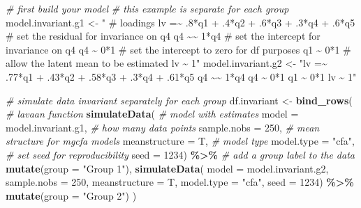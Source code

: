 \documentclass[
  man]{apa7}
\newenvironment{Shaded}{\begin{snugshade}}{\end{snugshade}}
\newcommand{\AttributeTok}[1]{\textcolor[rgb]{0.13,0.29,0.53}{#1}}
\newcommand{\CommentTok}[1]{\textcolor[rgb]{0.56,0.35,0.01}{\textit{#1}}}
\newcommand{\DecValTok}[1]{\textcolor[rgb]{0.00,0.00,0.81}{#1}}
\newcommand{\FunctionTok}[1]{\textcolor[rgb]{0.13,0.29,0.53}{\textbf{#1}}}
\newcommand{\NormalTok}[1]{#1}
\newcommand{\OtherTok}[1]{\textcolor[rgb]{0.56,0.35,0.01}{#1}}
\newcommand{\SpecialCharTok}[1]{\textcolor[rgb]{0.81,0.36,0.00}{\textbf{#1}}}
\newcommand{\StringTok}[1]{\textcolor[rgb]{0.31,0.60,0.02}{#1}}
\begin{document}
\begin{Shaded}
\begin{Highlighting}[]
\CommentTok{\# first build your model}
\CommentTok{\# this example is separate for each group}
\NormalTok{model.invariant.g1 }\OtherTok{\textless{}{-}} \StringTok{"}
\StringTok{\# loadings}
\StringTok{lv =\textasciitilde{} .8*q1 + .4*q2 + .6*q3 + .3*q4 + .6*q5 }
\StringTok{\# set the residual for invariance on q4}
\StringTok{q4 \textasciitilde{}\textasciitilde{} 1*q4}
\StringTok{\# set the intercept for invariance on q4}
\StringTok{q4 \textasciitilde{} 0*1}
\StringTok{\# set the intercept to zero for df purposes}
\StringTok{q1 \textasciitilde{} 0*1}
\StringTok{\# allow the latent mean to be estimated }
\StringTok{lv \textasciitilde{} 1"}
\NormalTok{model.invariant.g2 }\OtherTok{\textless{}{-}} \StringTok{"lv =\textasciitilde{} .77*q1 + .43*q2 + .58*q3 + .3*q4 + .61*q5}
\StringTok{q4 \textasciitilde{}\textasciitilde{} 1*q4}
\StringTok{q4 \textasciitilde{} 0*1}
\StringTok{q1 \textasciitilde{} 0*1}
\StringTok{lv \textasciitilde{} 1"}

\CommentTok{\# simulate data invariant separately for each group}
\NormalTok{df.invariant }\OtherTok{\textless{}{-}} \FunctionTok{bind\_rows}\NormalTok{(}
  \CommentTok{\# lavaan function }
  \FunctionTok{simulateData}\NormalTok{(}
    \CommentTok{\# model with estimates }
    \AttributeTok{model =}\NormalTok{ model.invariant.g1, }
    \CommentTok{\# how many data points}
    \AttributeTok{sample.nobs =} \DecValTok{250}\NormalTok{, }
    \CommentTok{\# mean structure for mgcfa models }
    \AttributeTok{meanstructure =}\NormalTok{ T, }
    \CommentTok{\# model type}
    \AttributeTok{model.type =} \StringTok{"cfa"}\NormalTok{,}
    \CommentTok{\# set seed for reproducibility }
    \AttributeTok{seed =} \DecValTok{1234}\NormalTok{) }\SpecialCharTok{\%\textgreater{}\%} 
    \CommentTok{\# add a group label to the data }
    \FunctionTok{mutate}\NormalTok{(}\AttributeTok{group =} \StringTok{"Group 1"}\NormalTok{), }
  \FunctionTok{simulateData}\NormalTok{(}
    \AttributeTok{model =}\NormalTok{ model.invariant.g2, }
    \AttributeTok{sample.nobs =} \DecValTok{250}\NormalTok{, }
    \AttributeTok{meanstructure =}\NormalTok{ T, }
    \AttributeTok{model.type =} \StringTok{"cfa"}\NormalTok{,}
    \AttributeTok{seed =} \DecValTok{1234}\NormalTok{) }\SpecialCharTok{\%\textgreater{}\%} 
    \FunctionTok{mutate}\NormalTok{(}\AttributeTok{group =} \StringTok{"Group 2"}\NormalTok{) }
\NormalTok{)}
\end{Highlighting}
\end{Shaded}
\end{document}
